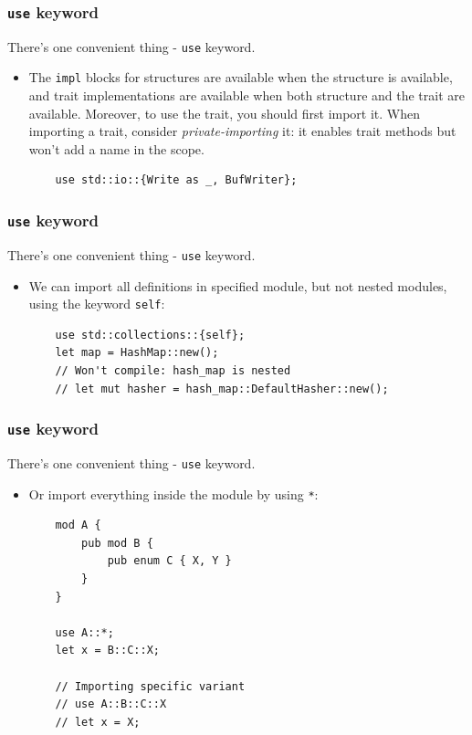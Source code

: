 \documentclass[aspectratio=1610,t]{beamer}
\begin{document}
\begin{frame}[fragile]
\frametitle{\texttt{use} keyword}
There's one convenient thing - \texttt{use} keyword.

\begin{itemize}
    \item<1-> The \texttt{impl} blocks for structures are available when the structure is available, and trait implementations are available when both structure and the trait are available. Moreover, to use the trait, you should first import it. When importing a trait, consider \textit{private-importing} it: it enables trait methods but won't add a name in the scope.

    \begin{verbatim}
    use std::io::{Write as _, BufWriter};
    \end{verbatim}
\end{itemize}
\end{frame}


\begin{frame}[fragile]
\frametitle{\texttt{use} keyword}
There's one convenient thing - \texttt{use} keyword.

\begin{itemize}
    \item<1-> We can import all definitions in specified module, but not nested modules, using the keyword \texttt{self}:
    
    \begin{verbatim}
    use std::collections::{self};
    let map = HashMap::new();
    // Won't compile: hash_map is nested
    // let mut hasher = hash_map::DefaultHasher::new();
    \end{verbatim}
\end{itemize}
\end{frame}


\begin{frame}[fragile]
\frametitle{\texttt{use} keyword}
There's one convenient thing - \texttt{use} keyword.

\begin{itemize}
    \item<1-> Or import everything inside the module by using \texttt{*}:
    
    \begin{verbatim}
    mod A {
        pub mod B {
            pub enum C { X, Y }
        }
    }

    use A::*;
    let x = B::C::X;

    // Importing specific variant
    // use A::B::C::X
    // let x = X;
    \end{verbatim}
\end{itemize}
\end{frame}
\end{document}
